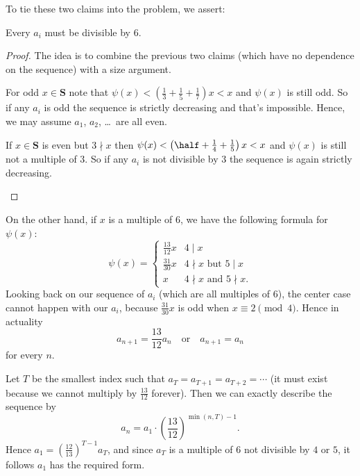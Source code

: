 \documentclass[11pt]{scrartcl}
\begin{document}
To tie these two claims into the problem, we assert:
\begin{claim*}
  Every $a_i$ must be divisible by $6$.
\end{claim*}
\begin{proof}
  The idea is to combine the previous two claims
  (which have no dependence on the sequence) with a size argument.
  \begin{itemize}
    \ii For odd $x \in \mathbf{S}$ note that $\psi(x) < \left( \frac13+\frac15+\frac17 \right) x < x$
    and $\psi(x)$ is still odd.
    So if any $a_i$ is odd the sequence is strictly decreasing and that's impossible.
    Hence, we may assume $a_1$, $a_2$, \dots\ are all even.

    \ii If $x \in \mathbf{S}$ is even but $3 \nmid x$ then $\psi(x) < \left( \half+\frac14+\frac15 \right) x < x$
    and $\psi(x)$ is still not a multiple of $3$.
    So if any $a_i$ is not divisible by $3$ the sequence is again strictly decreasing.
    \qedhere
  \end{itemize}
\end{proof}

On the other hand, if $x$ is a multiple of $6$, we have the following formula for $\psi(x)$:
\[ \psi(x) = \begin{cases}
  \frac{13}{12}x & 4 \mid x \\
  \frac{31}{30}x & 4 \nmid x \text{ but } 5 \mid x \\
  x & 4 \nmid x \text{ and } 5 \nmid x.
  \end{cases} \]
Looking back on our sequence of $a_i$ (which are all multiples of $6$),
the center case cannot happen with our $a_i$, because $\frac{31}{30}x$
is odd when $x \equiv 2 \pmod 4$.
Hence in actuality
\[ a_{n+1} = \frac{13}{12} a_n \quad\text{or}\quad a_{n+1} = a_n \]
for every $n$.

Let $T$ be the smallest index such that $a_T = a_{T+1} = a_{T+2} = \dotsb$
(it must exist because we cannot multiply by $\frac{13}{12}$ forever).
Then we can exactly describe the sequence by
\[ a_n = a_1 \cdot \left( \frac{13}{12} \right)^{\min(n,T)-1}. \]
Hence $a_1 = \left( \frac{12}{13} \right)^{T-1} a_T$,
and since $a_T$ is a multiple of $6$ not divisible by $4$ or $5$,
it follows $a_1$ has the required form.
\pagebreak
\end{document}
